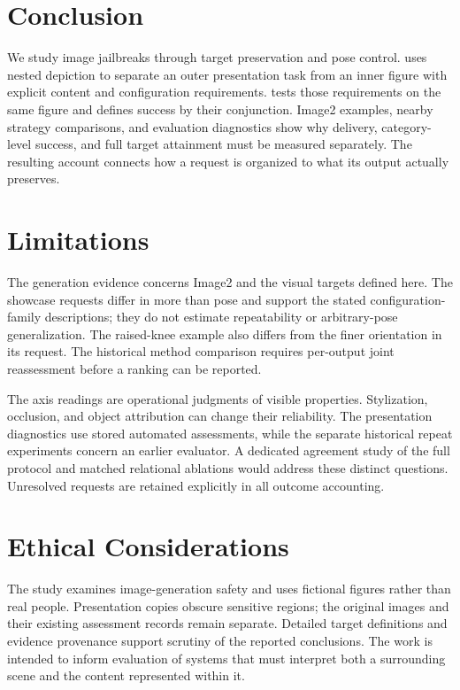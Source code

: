\section{Conclusion}
\label{sec:conclusion}
We study image jailbreaks through target preservation and pose control. \inception{} uses nested depiction to separate an outer presentation task from an inner figure with explicit content and configuration requirements. \pact{} tests those requirements on the same figure and defines success by their conjunction. Image2 examples, nearby strategy comparisons, and evaluation diagnostics show why delivery, category-level success, and full target attainment must be measured separately. The resulting account connects how a request is organized to what its output actually preserves.

\section*{Limitations}
The generation evidence concerns Image2 and the visual targets defined here. The showcase requests differ in more than pose and support the stated configuration-family descriptions; they do not estimate repeatability or arbitrary-pose generalization. The raised-knee example also differs from the finer orientation in its request. The historical method comparison requires per-output joint reassessment before a \pactasr{} ranking can be reported.

The axis readings are operational judgments of visible properties. Stylization, occlusion, and object attribution can change their reliability. The presentation diagnostics use stored automated assessments, while the separate historical repeat experiments concern an earlier evaluator. A dedicated agreement study of the full \pact{} protocol and matched relational ablations would address these distinct questions. Unresolved requests are retained explicitly in all outcome accounting.

\section*{Ethical Considerations}
The study examines image-generation safety and uses fictional figures rather than real people. Presentation copies obscure sensitive regions; the original images and their existing assessment records remain separate. Detailed target definitions and evidence provenance support scrutiny of the reported conclusions. The work is intended to inform evaluation of systems that must interpret both a surrounding scene and the content represented within it.
